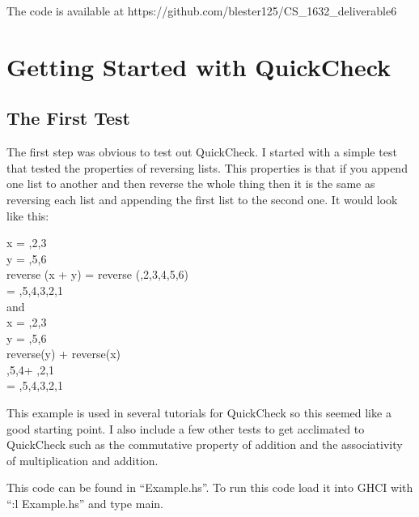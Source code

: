 \documentclass[titlepage]{article}
\begin{document}
The code is available at https://github.com/blester125/CS\_1632\_deliverable6

\section{Getting Started with QuickCheck}
\subsection{The First Test}
The first step was obvious to test out QuickCheck. I started with a simple test 
that tested the properties of reversing lists. This properties is that if you 
append one list to another and then reverse the whole thing then it is the same 
as reversing each list and appending the first list to the second one. It would 
look like this: 

\begin{centering}
	x = ,2,3\rbrack \\
	y = ,5,6\rbrack \\
	reverse (x + y) = reverse (,2,3,4,5,6\rbrack ) \\
	= ,5,4,3,2,1\rbrack \\
	and \\
	x = ,2,3\rbrack  \\
	y = ,5,6\rbrack \\
	reverse(y) + reverse(x) \\
	,5,4\rbrack + ,2,1\rbrack \\
	  = ,5,4,3,2,1\rbrack \\
\end{centering}
This example is used in several tutorials for QuickCheck so this seemed like a 
good starting point. I also include a few other tests to get acclimated to 
QuickCheck such as the commutative property of addition and the associativity of 
multiplication and addition.

This code can be found in ``Example.hs''. To run this code load it into GHCI with 
``:l Example.hs'' and type main. 
\end{document}
